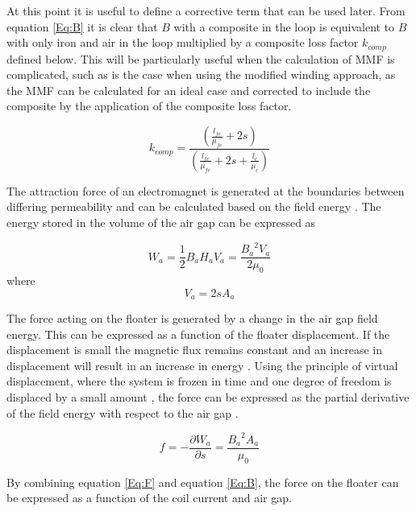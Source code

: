 At this point it is useful to define a corrective term that can be used later. From equation \ref{Eq:B} it is clear that $B$ with a composite in the loop is equivalent to $B$ with only iron and air in the loop multiplied by a composite loss factor $k_{comp}$ defined below. This will be particularly useful when the calculation of MMF is complicated, such as is the case when using the modified winding approach, as the MMF can be calculated for an ideal case and corrected to include the composite by the application of the composite loss factor.

\begin{equation}\label{Eq:Kc}
	k_{comp}=\frac{\left(\frac{{l}_{fe}}{{\mu}_{fe}}+2s\right)}{\left(\frac{{l}_{fe}}{{\mu}_{fe}}+2s+\frac{{l}_{c}}{{\mu}_{c}}\right)}
\end{equation}


The attraction force of an electromagnet is generated at the boundaries between differing permeability and can be calculated based on the field energy \cite{MagBear}.  The energy stored in the volume of the air gap can be expressed as

\begin{equation}\label{Eq:Wa}
	{W}_{a}=\frac{1}{2}{B}_{a}{H}_{a}{V}_{a}=\frac{{{B}_{a}}^{2}{V}_{a}}{2{\mu}_{0}}
\end{equation}
where
\begin{equation}\label{Eq:Va}
	{V}_{a}=2s{A}_{a}
\end{equation}

The force acting on the floater is generated by a change in the air gap field energy. This can be expressed as a function of the floater displacement. If the displacement is small the magnetic flux remains constant and an increase in displacement will result in an increase in energy \cite{MagBear}. Using the principle of virtual displacement, where the system is frozen in time and one degree of freedom is displaced by a small amount \cite{AnaMech}, the force can be expressed as the partial derivative of the field energy with respect to the air gap \cite{MagBear}.

\begin{equation}\label{Eq:F}
	f=-\frac{\partial {W}_{a}}{\partial s}=\frac{{{B}_{a}}^{2}{A}_{a}}{{\mu}_{0}}
\end{equation}

By combining equation \ref{Eq:F} and equation \ref{Eq:B}, the force on the floater can be expressed as a function of the coil current and air gap.

